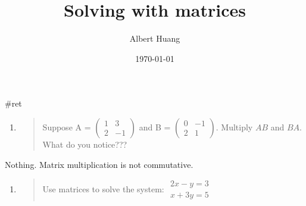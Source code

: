 \documentclass[letterpaper]{article}
\author{Albert Huang}
\date{\today}
\title{Solving with matrices}
\renewcommand\maketitle{}
\begin{document}
\maketitle
\#ret

\begin{enumerate}
\item \begin{quote}
Suppose A = \(\begin{pmatrix} 1 & 3\\ 2 & -1 \end{pmatrix}\) and B
= \(\begin{pmatrix} 0 & -1\\ 2 & 1 \end{pmatrix}\). Multiply \(AB\)
and \(BA\). What do you notice???
\end{quote}
\end{enumerate}

Nothing. Matrix multiplication is not commutative.

\begin{enumerate}
\item \begin{quote}
Use matrices to solve the system:
\(\begin{aligned}2x-y=3\\x+3y=5\end{aligned}\)
\end{quote}
\end{enumerate}
\end{document}
